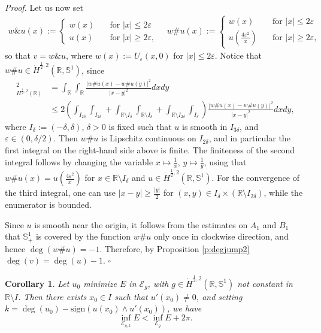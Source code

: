 \documentclass[12pt, a4paper]{article}
\newtheorem{cor}[thm]{Corollary}
\newenvironment{proof}{\noindent\emph{Proof.}}{\hfill$\square$\medskip}
\newcommand{\M}[1]{\mathcal{#1}}
\newcommand{\sph}{\mathbb{S}}
\newcommand{\R}{\mathbb{R}}
\newcommand{\ve}{\varepsilon}
\renewcommand{\(}{\left(}
\renewcommand{\)}{\right)}
\begin{document}
\begin{proof}
Let us now set
\begin{align*}
w\& u(x):=\left\{ \begin{array}{ll}w(x)&\quad\text{for }|x|\leq2\ve \\ u(x)&\quad\text{for }|x|\geq2\ve,  \end{array} \right. \quad w\# u(x):=\left\{ \begin{array}{ll}w(x)&\quad\text{for }|x|\leq2\ve\\ u(\frac{4\ve^2}{x})&\quad\text{for }|x|\geq2\ve,  \end{array} \right.    \end{align*} so that $v=w\&u$, where  $w(x):=U_\ve(x,0)$ for $|x|\leq 2\ve.$ 
Notice that $w\#u \in \dot H^{\frac12,2}(\R,\sph^1)$, since 
\begin{align*}
[w\#u]_{H^{\frac12,2}(\R)}^2&= \int_\R\int_\R\frac{|w\#u(x)-w\#u(y)|^2}{|x-y|^2}dxdy
\\
&\leq 2\left( \int_{I_{2\delta}}\int_{I_{2\delta}} +\int_{\R\setminus I_{\delta}}\int_{ \R\setminus I_\delta}  +\int_{\R\setminus I_{2\delta}}\int_{ I_\delta}     \right)\frac{|w\#u(x)-w\#u(y)|^2}{|x-y|^2}dxdy , \end{align*}
where $I_\delta:=(-\delta,\delta)$, $\delta>0$ is fixed such that $u$ is smooth in $I_{3\delta}$, and $\ve\in (0,\delta/2)$. Then $w\#u$ is Lipschitz continuous on $I_{2\delta}$, and in particular the first integral on the right-hand side above is finite. The finiteness of the second integral follows by changing the variable $x\mapsto \frac1x,\,y\mapsto\frac1y$, using that $w\#u(x)=u(\frac{4\ve^2}{x})$ for $x\in \R\setminus I_\delta$ and $u\in \dot H^{\frac12,2}(\R,\sph^1)$. For the convergence of the third integral, one can use $|x-y|\geq \frac{|y|}{2}$ for $(x,y)\in I_\delta\times(\R\setminus I_{2\delta})$, while the enumerator is bounded.  

Since $u$ is smooth near the origin, it follows from the estimates on $A_1$ and $B_1$ that $\sph^1_+$  is covered by the   function  $w\#u $ only once in clockwise direction,  and hence  $\deg(w\#u)=-1$. Therefore, by Proposition \ref{p:degjump2} $\deg(v)=\deg(u)-1.$
\end{proof}

\begin{cor}\label{c:est} Let $u_0$ minimize $E$ in $\M{E}_g$, with $g\in \dot H^{\frac12,2}(\R,\sph^1)$ not constant in $\R\setminus I$. Then there exists $x_0\in I$ such that $u'(x_0)\ne 0$, and setting $k=\deg(u_0)-\mathrm{sign}(u(x_0)\wedge u'(x_0))$, we have
\begin{equation}\label{eqc:est}
\inf_{\M{E}_{g,k}} E< \inf_{\M{E}_g}E+2\pi.
\end{equation}
\end{cor}
\end{document}

